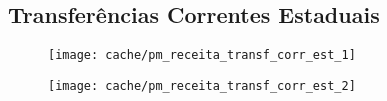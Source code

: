 
\subsection{Transferências Correntes Estaduais}





\begin{figure}[H]
\center
\texttt{[image: cache/pm\_receita\_transf\_corr\_est\_1]}
\end{figure}

\begin{figure}[H]
\center
\texttt{[image: cache/pm\_receita\_transf\_corr\_est\_2]}
\end{figure}
